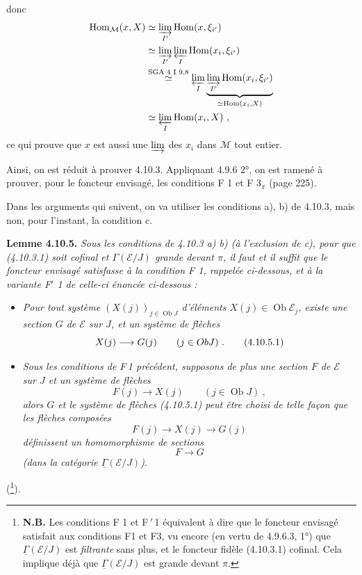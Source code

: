 \documentclass[11pt]{article}
\newcommand{\printedpage}[1]{\marginpar{\footnotesize p.~#1}}
\newcommand{\msp}[1]{\marginpar{\footnotesize [#1]}}
\newcommand{\Ob}{\operatorname{Ob}}
\newcommand{\uGamma}{\underline{\Gamma}}
\newcommand{\Hom}{\operatorname{Hom}}
\begin{document}
\printedpage{94}
donc
\[
\begin{aligned}
\Hom_{\mathcal{M}}(x,X) &\simeq \varinjlim_{I'} \Hom(x,\xi_{i'})\\
&\simeq \varinjlim_{I'} \varprojlim_{I} \Hom(x_i,\xi_{i'})\\
&\overset{\text{SGA 4 I 9.8}}{\simeq} \varprojlim_{I} \underbrace{\varinjlim_{I'} \Hom(x_i,\xi_{i'})}_{\simeq \Hom(x_i,X)}\\
&\simeq \varprojlim_{I} \Hom(x_i,X)\ ,
\end{aligned}
\]
ce qui prouve que $x$ est aussi une $\varinjlim$ des $x_i$ dans $\mathcal{M}$ tout entier.

\msp{250}
Ainsi, on est réduit à prouver 4.10.3. Appliquant 4.9.6 2°, on est ramené à prouver, pour le foncteur envisagé, les conditions F 1 et F $3_\pi$ (page 225).

Dans les arguments qui suivent, on va utiliser les conditions a), b) de 4.10.3, mais non, pour l'instant, la condition c.

\textbf{Lemme 4.10.5.} \textit{Sous les conditions de 4.10.3 a) b) (à l'exclusion de c), pour que (4.10.3.1) soit cofinal et $\Gamma(\mathcal{E}/J)$ grande devant $\pi$, il faut et il suffit que le foncteur envisagé satisfasse à la condition F 1, rappelée ci-dessous, et à la variante F$'$ 1 de celle-ci énoncée ci-dessous :}
\begin{itemize}[leftmargin=3em]
\item[F\,1)] {\itshape Pour tout système $(X(j))_{j\in\Ob J}$ d'éléments $X(j)\in\Ob\mathcal{E}_j$, existe une \textup{section} $G$ de $\mathcal{E}$ sur $J$, et un système de flèches
\[
X(j) \longrightarrow G(j) \qquad (j\in ObJ)\ . \tag*{\textup{(4.10.5.1)}}
\]}
\item[F$'$1)] {\itshape Sous les conditions de \textup{F\,1} précédent, supposons de plus une section $F$ de $\mathcal{E}$ sur $J$ \msp{251} et un système de flèches
\[
F(j) \longrightarrow X(j) \qquad (j\in\Ob J)\ ,
\]
alors $G$ et le système de flèches (4.10.5.1) peut être choisi de telle façon que les flèches composées
\[
F(j) \longrightarrow X(j) \longrightarrow G(j)
\]
définissent un homomorphisme de sections
\[
F \longrightarrow G
\]
(dans la catégorie $\uGamma(\mathcal{E}/J)$).}
\end{itemize}
(\footnote[106]{\textbf{N.B.} Les conditions F 1 et F$\,'$\,1 équivalent à dire que le foncteur envisagé satisfait aux conditions F1 et F3, vu encore (en vertu de 4.9.6.3, 1°) que $\uGamma(\mathcal{E}/J)$ est \textit{filtrante} sans plus, et le foncteur fidèle (4.10.3.1) cofinal. Cela implique déjà que $\uGamma(\mathcal{E}/J)$ est grande devant $\pi$.}).
\end{document}
